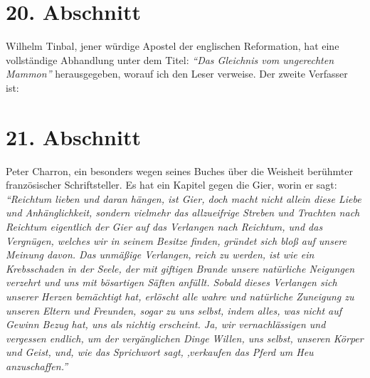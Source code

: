 \section{20. Abschnitt} \label{kap13_ab20}

Wilhelm Tinbal, jener würdige Apostel der
englischen Reformation, hat eine
vollständige Abhandlung unter dem Titel: \textit{"`Das Gleichnis vom ungerechten Mammon"'}
herausgegeben, worauf ich den Leser verweise. Der zweite Verfasser ist:

\section{21. Abschnitt} \label{kap13_ab21}

Peter Charron, ein besonders wegen seines
Buches über die Weisheit berühmter
französischer Schriftsteller. Es hat ein Kapitel gegen die Gier, worin er sagt:
\textit{"`Reichtum lieben und daran hängen, ist Gier, doch macht nicht allein
diese
Liebe und Anhänglichkeit, sondern vielmehr das allzueifrige Streben und Trachten
nach Reichtum eigentlich der Gier auf das Verlangen nach Reichtum, und das
Vergnügen, welches wir in seinem Besitze finden, gründet sich bloß auf unsere
Meinung davon. Das unmäßige Verlangen, reich zu werden, ist wie ein Krebsschaden
in der Seele, der mit giftigen Brande unsere natürliche Neigungen verzehrt und
uns mit bösartigen Säften anfüllt. Sobald dieses Verlangen sich unserer Herzen
bemächtigt hat, erlöscht alle wahre und natürliche Zuneigung zu unseren Eltern
und Freunden, sogar zu uns selbst, indem alles, was nicht auf Gewinn Bezug hat,
uns als nichtig erscheint. Ja, wir vernachlässigen und vergessen endlich, um der
vergänglichen Dinge Willen, uns selbst, unseren Körper und Geist, und, wie das
Sprichwort sagt, ‚verkaufen das Pferd um Heu anzuschaffen."'}

